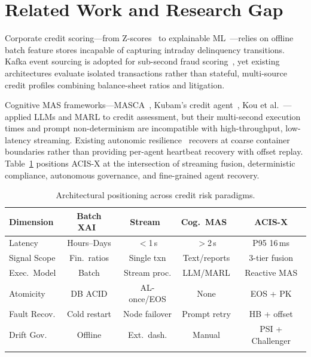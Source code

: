 \documentclass[pdflatex,sn-mathphys-num]{sn-jnl}
\theoremstyle{thmstyleone}
\theoremstyle{thmstyletwo}
\theoremstyle{thmstylethree}
\begin{document}
\section{Related Work and Research Gap}\label{sec:related}

Corporate credit scoring---from Z-scores~\cite{altman1968financial} to explainable ML~\cite{chang2025explainable,nwafor2024hybrid}---relies on offline batch feature stores incapable of capturing intraday delinquency transitions. Kafka event sourcing is adopted for sub-second fraud scoring~\cite{kesarpu2025kafka,parnerkar2025eda}, yet existing architectures evaluate isolated transactions rather than stateful, multi-source credit profiles combining balance-sheet ratios and litigation.

Cognitive MAS frameworks---MASCA~\cite{jajoo2025masca}, Kubam's credit agent~\cite{kubam2026agentic}, Kou et al.~\cite{kou2025learning}---applied LLMs and MARL to credit assessment, but their multi-second execution times and prompt non-determinism are incompatible with high-throughput, low-latency streaming. Existing autonomic resilience~\cite{beereddy2025selfhealing,kephart2003autonomic} recovers at coarse container boundaries rather than providing per-agent heartbeat recovery with offset replay. Table~\ref{tab:comparison} positions ACIS-X at the intersection of streaming fusion, deterministic compliance, autonomous governance, and fine-grained agent recovery.

\begin{table}[htbp]
\caption{Architectural positioning across credit risk paradigms.}\label{tab:comparison}
\centering\footnotesize
\begin{tabular}{@{}lcccc@{}}
\toprule
\textbf{Dimension} & \textbf{Batch XAI~\cite{chang2025explainable}} & \textbf{Stream~\cite{parnerkar2025eda}} & \textbf{Cog.\ MAS~\cite{jajoo2025masca}} & \textbf{ACIS-X} \\
\midrule
Latency       & Hours--Days  & $<$1\,s     & $>$2\,s        & P95 16\,ms \\
Signal Scope  & Fin.\ ratios & Single txn  & Text/reports   & 3-tier fusion \\
Exec.\ Model  & Batch        & Stream proc.& LLM/MARL       & Reactive MAS \\
Atomicity     & DB ACID      & AL-once/EOS & None           & EOS + PK \\
Fault Recov.  & Cold restart & Node failover& Prompt retry  & HB + offset \\
Drift Gov.    & Offline      & Ext.\ dash. & Manual         & PSI + Challenger \\
\botrule
\end{tabular}
\end{table}
\end{document}
